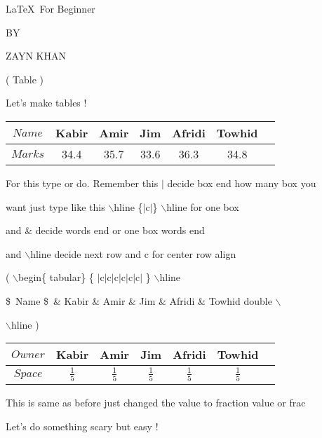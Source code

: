 \documentclass[11pt]{article}
\begin{document}
\begin{center}
\Large \LaTeX\ For Beginner

\small BY

\Large ZAYN KHAN

\large ( Table )
\end{center}


Let's make tables !
\vspace{1cm}

\begin{tabular}{|c||c|c|c|c|c|c|}
\hline
$Name$ & Kabir & Amir & Jim & Afridi & Towhid \\ \hline
$Marks$ & 34.4 & 35.7 & 33.6 & 36.3 & 34.8 \\ \hline

\end{tabular}
\vspace{1cm}

For this type or do. Remember this $ | $ decide box end how many box you 

want just type like this $\backslash$hline \{$|$c$|$\} $\backslash$hline for one box

and \& decide words end or one box words end

and $\backslash$hline decide next row and c for center row align

( $\backslash$begin\{ tabular\} \{ $|$c$|$c$|$c$|$c$|$c$|$c$|$ \} $\backslash$hline 

\$\ Name \$\ \& Kabir \& Amir \& Jim \& Afridi \& Towhid double $\backslash$

 $\backslash$hline )



\vspace{1cm}

\begin{tabular}{|c||c|c|c|c|c|c|}
\hline

$Owner$ & Kabir & Amir & Jim & Afridi & Towhid \\ \hline
$Space$ & $\frac{1}{5}$ & $\frac{1}{5}$ & $\frac{1}{5}$ & $\frac{1}{5}$ & $\frac{1}{5}$ \\ \hline

\end{tabular}

\vspace{1cm}


This is same as before just changed the value to fraction value or frac

Let's do something scary but easy !
\end{document}
